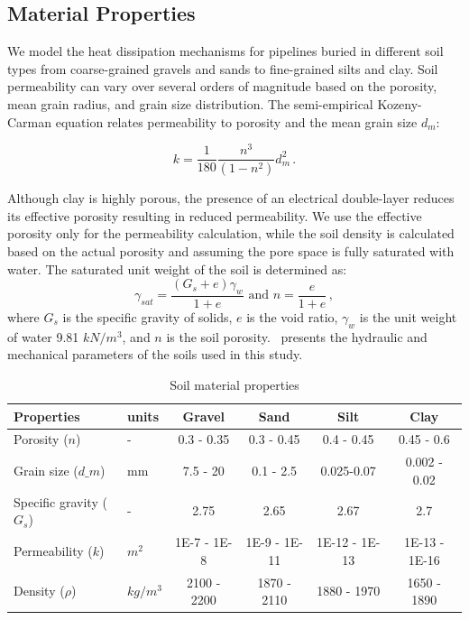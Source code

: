 \documentclass[Journal,letterpaper,InsideFigs]{ascelike-new}
\begin{document}
\subsection*{Material Properties}
We model the heat dissipation mechanisms for pipelines buried in different soil types from coarse-grained gravels and sands to fine-grained silts and clay. Soil permeability can vary over several orders of magnitude based on the porosity, mean grain radius, and grain size distribution. The semi-empirical Kozeny-Carman equation relates permeability to porosity and the mean grain size $d_m$:

\begin{equation}
k = \frac{1}{180} \frac{n^3}{(1-n^2)} d_m^2\,.
\end{equation}

Although clay is highly porous, the presence of an electrical double-layer reduces its effective porosity resulting in reduced permeability. We use the effective porosity only for the permeability calculation, while the soil density is calculated based on the actual porosity and assuming the pore space is fully saturated with water. The saturated unit weight of the soil is determined as:
\begin{equation}
 \gamma_{sat} = \frac{(G_s + e) \gamma_w}{1+e} \text{ and } n = \frac{e}{1+e}\,,   
\end{equation}
where $G_s$ is the specific gravity of solids, $e$ is the void ratio, $\gamma_w$ is the unit weight of water 9.81 $kN/m^3$, and $n$ is the soil porosity.~ presents the hydraulic and mechanical parameters of the soils used in this study. 

\begin{table}[]
\caption{Soil material properties}
\label{tab:soil}
\begin{tabular}{llcccc}
\toprule
\textbf{Properties}           &   \textbf{units}                      & \textbf{Gravel} & \textbf{Sand} & \textbf{Silt} & \textbf{Clay} \\
\midrule
Porosity ($n$)                  & -                       & 0.3 - 0.35      & 0.3 - 0.45    & 0.4 - 0.45    & 0.45 - 0.6    \\
Grain size ($d\_m$)             & mm                      & 7.5 - 20        & 0.1 - 2.5     & 0.025-0.07    & 0.002 - 0.02  \\
Specific gravity ($G_s$)         & -                       & 2.75            & 2.65          & 2.67          & 2.7           \\
Permeability ($k$)              & $m^2$    & 1E-7 - 1E-8     & 1E-9 - 1E-11  & 1E-12 - 1E-13 & 1E-13 - 1E-16 \\
Density ($\rho$) & $kg/m^3$ & 2100 - 2200     & 1870 - 2110   & 1880 - 1970   & 1650 - 1890  \\
\bottomrule
\end{tabular}
\end{table}
\end{document}
